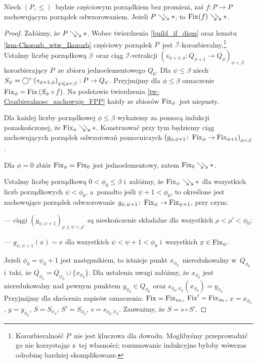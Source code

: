 \begin{tw}\label{tw-fixed_point_set_of_a_map_is_dismantlable}
Niech $(P,\leq)$~będzie częściowym porządkiem bez promieni, zaś $f\colon P\to P$ zachowującym porządek odwzorowaniem. Jeżeli $P\searrow\!\!\searrow *$, to $\operatorname{Fix}(f)\searrow\!\!\searrow *$.
\end{tw}
\begin{proof}
Załóżmy, że $P\searrow\!\!\searrow *$. Wobec twierdzenia \ref{build_if_dism} oraz lematu \ref{lem-Ckorozb_wtw_Ikorozb} częściowy porządek $P$~jest $\mathcal{I}$-korozbieralny.\footnote{Korozbieralność $P$~nie jest kluczowa dla dowodu. Moglibyśmy przeprowadzić go nie korzystając z~tej własności; rozumowanie indukcyjne byłoby wówczas odrobinę bardziej skomplikowane.} Ustalmy liczbę porządkową $\beta$~oraz ciąg $\mathcal{I}$-retrakcji $(s_{\phi+1,\phi}\colon Q_{\phi+1}\to Q_{\phi})_{\phi<\beta}$ korozbierający $P$~ze zbioru jednoelementowego $Q_0$. Dla $\psi\leq\beta$ niech $S_\psi=\bigcirc^\leftarrow\!\!\left(s_{\phi+1,\phi}\right)_{\psi\leqslant \phi<\beta}:P\to Q_{\psi}$. Przyjmijmy dla $\phi\leq\beta$ oznaczenie $\operatorname{Fix}_\phi=\operatorname{Fix}\left(S_\phi \circ f\right)$. Na podstawie twierdzenia \ref{tw-Crozbieralnosc_zachowuje_FPP} każdy ze zbiorów $\operatorname{Fix}_\phi$~jest niepusty.

Dla każdej liczby porządkowej $\phi\leq\beta$ wykażemy za pomocą indukcji pozaskończonej, że $\operatorname{Fix}_\phi\searrow\!\!\searrow *$. Konstruować przy tym będziemy ciąg zachowujących porządek odwzorowań  pomocniczych $\left(g_{\phi,\phi+1}\colon \operatorname{Fix}_\phi\to \operatorname{Fix}_{\phi+1}\right)_{\phi<\beta}$.

Dla $\phi=0$ zbiór $\operatorname{Fix}_\phi=\operatorname{Fix}_0$ jest jednoelementowy, zatem $\operatorname{Fix}_0\searrow\!\!\searrow *$.

Ustalmy liczbę porządkową $0<\phi_0\leq \beta$ i~załóżmy, że $\operatorname{Fix}_\psi\searrow\!\!\searrow *$ dla wszystkich liczb porządkowych $\psi<\phi_0$, a~ponadto jeśli $\psi+1<\phi_0$, to określone jest zachowujące porządek odwzorowanie $g_{\psi,\psi+1}\colon \operatorname{Fix}_{\psi}\to \operatorname{Fix}_{\psi+1}$, przy czym:
\begin{compactitem}
\item[---] ciągi $\left(g_{\psi,\psi+1}\right)_{\rho\leq\psi<\rho'}$ są nieskończenie składalne dla wszystkich $\rho<\rho'<\phi_0$;
\item[---] $g_{\psi,\psi+1}(x)\sim x$ dla wszystkich $\psi<\psi+1<\phi_0$ i~wszystkich $x\in\operatorname{Fix}_{\psi}$.
\end{compactitem}

Jeżeli $\phi_0=\psi_0+1$ jest następnikiem, to istnieje punkt $x_{\phi_0}$~nieredukowalny w~$Q_{\phi_0}$ i~taki, że $Q_{\phi_0}=Q_{\psi_0}\cup\{x_{\phi_0}\}$. Dla ustalenia uwagi załóżmy, że $x_{\phi_0}$ jest nieredukowalny nad pewnym punktem $y_{\phi_0}\in Q_{\phi_0}$ oraz $s_{\phi_0,\psi_0}\left(x_{\phi_0}\right)=y_{\phi_0}$. Przyjmijmy dla skrócenia zapisów oznaczenia: $\operatorname{Fix}=\operatorname{Fix}_{\psi_0}$, $\operatorname{Fix}'=\operatorname{Fix}_{\phi_0}$, $x=x_{\phi_0}$, $y=y_{\phi_0}$, $S=S_{\psi_0}$, $S'=S_{\phi_0}$, $s=s_{\phi_0,\psi_0}$. Zauważmy, że $S=s\circ S'$.


\end{proof}
